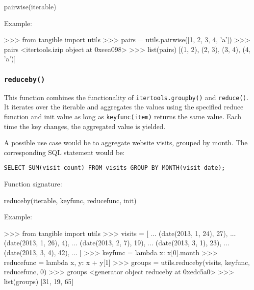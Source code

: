 \vspace{.5\baselineskip}
\begin{pythoncode}
pairwise(iterable)
\end{pythoncode}

\noindent Example:

\vspace{.5\baselineskip}
\begin{pythoncode}
>>> from tangible import utils
>>> pairs = utils.pairwise([1, 2, 3, 4, 'a'])
>>> pairs
<itertools.izip object at 0xeea098>
>>> list(pairs)
[(1, 2), (2, 3), (3, 4), (4, 'a')]
\end{pythoncode}

\subsubsection{\texttt{reduceby()}}

This function combines the functionality of \texttt{itertools.groupby()} and
\texttt{reduce()}. It iterates over the iterable and aggregates the values using
the specified reduce function and init value as long as \texttt{keyfunc(item)}
returns the same value. Each time the key changes, the aggregated value is
yielded.

A possible use case would be to aggregate website visits, grouped by month. The
corresponding SQL statement would be:

\vspace{.5\baselineskip}
\begin{verbatim}
SELECT SUM(visit_count) FROM visits GROUP BY MONTH(visit_date);
\end{verbatim}

\noindent Function signature:

\vspace{.5\baselineskip}
\begin{pythoncode}
reduceby(iterable, keyfunc, reducefunc, init)
\end{pythoncode}

\noindent Example:

\vspace{.5\baselineskip}
\begin{pythoncode}
>>> from tangible import utils
>>> visits = [
... (date(2013, 1, 24), 27),
... (date(2013, 1, 26), 4),
... (date(2013, 2, 7), 19),
... (date(2013, 3, 1), 23),
... (date(2013, 3, 4), 42),
... ]
>>> keyfunc = lambda x: x[0].month
>>> reducefunc = lambda x, y: x + y[1]
>>> groups = utils.reduceby(visits, keyfunc, reducefunc, 0)
>>> groups
<generator object reduceby at 0xedc5a0>
>>> list(groups)
[31, 19, 65]
\end{pythoncode}
